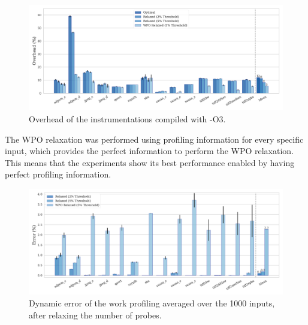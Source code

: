 \documentclass[sigplan,10pt]{acmart}
\theoremstyle{definition}
\newcommand{\flagstype}{\usefont{T1}{cmr}{m}{n}}
\begin{document}
\begin{figure}[ht]
    \centering
    \includegraphics[width=\textwidth]{figs/overhead-O3.pdf}
    \caption{Overhead of the instrumentations compiled with {\flagstype -O3}.}
    \label{fig:overhead-O3}
\end{figure}

The WPO relaxation was performed using profiling information for every specific input, which provides the perfect information to perform the WPO relaxation.
This means that the experiments show its best performance enabled by having perfect profiling information.


\begin{figure}[h!]
    \centering
    \includegraphics[width=\textwidth]{figs/error-O3.pdf}
    \caption{Dynamic error of the work profiling averaged over the 1000 inputs, after relaxing the number of probes.}
    \label{fig:error-O3}
\end{figure}

\end{document}
